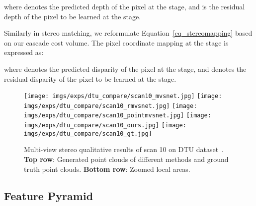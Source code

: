 \documentclass[10pt,twocolumn,letterpaper]{article}
\begin{document}
where  denotes the predicted depth of the  pixel at the  stage, and  is the residual depth of the  pixel to be learned at the  stage.

Similarly in stereo matching, we reformulate Equation~\ref{eq_stereomapping} based on our cascade cost volume.
The  pixel coordinate mapping at the  stage is expressed as: 

where  denotes the predicted disparity of the  pixel at the  stage,
and  denotes the residual disparity of the  pixel to be learned at the  stage.

\begin{figure*}[!th]
\begin{center}
\def\col{0.195}
{\texttt{[image: imgs/exps/dtu\_compare/scan10\_mvsnet.jpg]}}
{\texttt{[image: imgs/exps/dtu\_compare/scan10\_rmvsnet.jpg]}}
{\texttt{[image: imgs/exps/dtu\_compare/scan10\_pointmvsnet.jpg]}}
{\texttt{[image: imgs/exps/dtu\_compare/scan10\_ours.jpg]}} 
{\texttt{[image: imgs/exps/dtu\_compare/scan10\_gt.jpg]}} 
\end{center}
\vspace{-8mm}
 \caption{Multi-view stereo qualitative results of scan 10 on DTU dataset~\cite{aanaes2016dtu}. \textbf{Top row}: Generated point clouds of different methods and ground truth point clouds. \textbf{Bottom row}: Zoomed local areas.}
 \vspace{-2mm}
\label{fig:fig_mvs}
\end{figure*}

\subsection{Feature Pyramid}  
\end{document}
